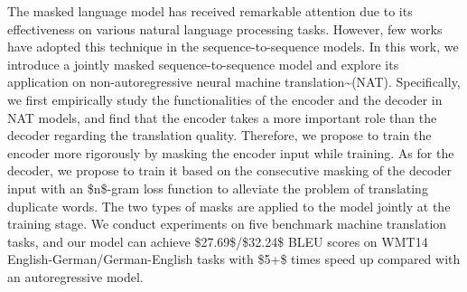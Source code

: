 The masked language model has received remarkable attention due to its effectiveness on various natural language processing tasks. However, few works have adopted this technique in the sequence-to-sequence models. In this work, we introduce a jointly masked sequence-to-sequence model and explore its application on non-autoregressive neural machine translation{\textasciitilde}(NAT). Specifically, we first empirically study the functionalities of the encoder and the decoder in NAT models, and find that the encoder takes a more important role than the decoder regarding the translation quality. Therefore, we propose to train the encoder more rigorously by masking the encoder input while training. As for the decoder, we propose to train it based on the consecutive masking of the decoder input with an \$n\$-gram loss function to alleviate the problem of translating duplicate words. The two types of masks are applied to the model jointly at the training stage. We conduct experiments on five benchmark machine translation tasks, and our model can achieve \$27.69\$/\$32.24\$ BLEU scores on WMT14 English-German/German-English tasks with \$5+\$ times speed up compared with an autoregressive model.
